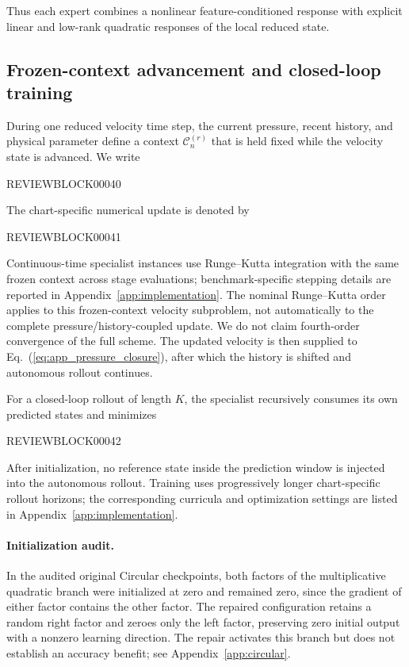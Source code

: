 \documentclass{article}
\def\plaineqref#1{\ref{#1}}
\begin{document}
Thus each expert combines a nonlinear feature-conditioned response with
explicit linear and low-rank quadratic responses of the local reduced state.


\subsection{Frozen-context advancement and closed-loop training}

During one reduced velocity time step, the current pressure, recent history, and
physical parameter define a context $\mathcal C_n^{(r)}$ that is held fixed
while the velocity state is advanced. We write


REVIEWBLOCK00040


The chart-specific numerical update is denoted by


REVIEWBLOCK00041


Continuous-time specialist instances use Runge--Kutta integration with the
same frozen context across stage evaluations; benchmark-specific stepping
details are reported in Appendix~\ref{app:implementation}.
The nominal Runge--Kutta order applies to this frozen-context velocity subproblem, not automatically to the complete pressure/history-coupled update. We do not claim fourth-order convergence of the full scheme.
The updated velocity is then supplied to
Eq.~(\plaineqref{eq:app_pressure_closure}), after which the history is
shifted and autonomous rollout continues.

For a closed-loop rollout of length $K$, the specialist recursively
consumes its own predicted states and minimizes


REVIEWBLOCK00042


After initialization, no reference state inside the prediction window is
injected into the autonomous rollout. Training uses progressively longer
chart-specific rollout horizons; the corresponding curricula and
optimization settings are listed in Appendix~\ref{app:implementation}.


\paragraph{Initialization audit.}
In the audited original Circular checkpoints, both factors of the
multiplicative quadratic branch were initialized at zero and remained
zero, since the gradient of either factor contains the other factor.
The repaired configuration retains a random right factor and zeroes only
the left factor, preserving zero initial output with a nonzero learning
direction. The repair activates this branch but does not establish an
accuracy benefit; see Appendix~\ref{app:circular}.
\end{document}
